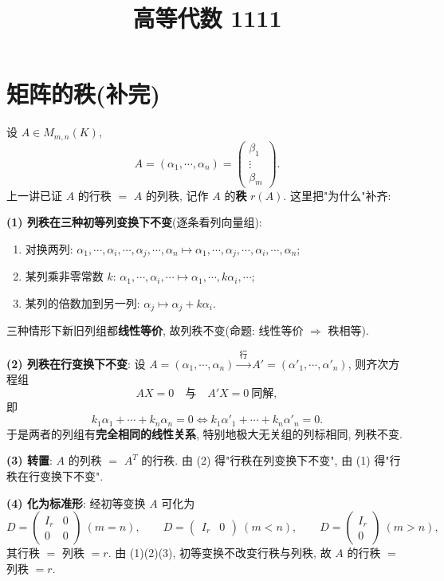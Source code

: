 \documentclass[UTF8,11pt]{ctexart}
\title{高等代数 1111}
\date{}
\theoremstyle{cnthm}
\begin{document}
\maketitle

\section{矩阵的秩(补完)}

设 $A\in M_{m,n}(K)$,
\[
A=(\alpha_1,\cdots,\alpha_n)=
\begin{pmatrix}\beta_1\\\vdots\\\beta_m\end{pmatrix}.
\]
上一讲已证 $A$ 的行秩 $=$ $A$ 的列秩, 记作 $A$ 的\textbf{秩} $r(A)$. 这里把"为什么"补齐:

\textbf{(1) 列秩在三种初等列变换下不变}(逐条看列向量组):

\begin{enumerate}
\item 对换两列: $\alpha_1,\cdots,\alpha_i,\cdots,\alpha_j,\cdots,\alpha_n\mapsto\alpha_1,\cdots,\alpha_j,\cdots,\alpha_i,\cdots,\alpha_n$;
\item 某列乘非零常数 $k$: $\alpha_1,\cdots,\alpha_i,\cdots\mapsto\alpha_1,\cdots,k\alpha_i,\cdots$;
\item 某列的倍数加到另一列: $\alpha_j\mapsto\alpha_j+k\alpha_i$.
\end{enumerate}

三种情形下新旧列组都\textbf{线性等价}, 故列秩不变(命题: 线性等价 $\Rightarrow$ 秩相等).

\textbf{(2) 列秩在行变换下不变}: 设 $A=(\alpha_1,\cdots,\alpha_n)\xrightarrow{\ \text{行}\ }A'=(\alpha'_1,\cdots,\alpha'_n)$, 则齐次方程组
\[
AX=0\quad\text{与}\quad A'X=0\ \text{同解},
\]
即
\[
k_1\alpha_1+\cdots+k_n\alpha_n=0
\iff
k_1\alpha'_1+\cdots+k_n\alpha'_n=0 .
\]
于是两者的列组有\textbf{完全相同的线性关系}, 特别地极大无关组的列标相同, 列秩不变.

\textbf{(3) 转置}: $A$ 的列秩 $=$ $A^{T}$ 的行秩. 由 (2) 得"行秩在列变换下不变", 由 (1) 得"行秩在行变换下不变".

\textbf{(4) 化为标准形}: 经初等变换 $A$ 可化为
\[
D=\begin{pmatrix}I_r&0\\0&0\end{pmatrix}\ (m=n),\qquad
D=\begin{pmatrix}I_r&0\end{pmatrix}\ (m<n),\qquad
D=\begin{pmatrix}I_r\\0\end{pmatrix}\ (m>n),
\]
其行秩 $=$ 列秩 $=r$. 由 (1)(2)(3), 初等变换不改变行秩与列秩, 故 $A$ 的行秩 $=$ 列秩 $=r$.
\end{document}
